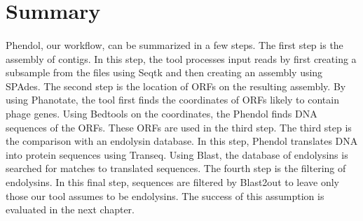 \section{Summary}
\paragraph*{}
Phendol, our workflow, can be summarized in a few steps. The first step is the assembly of contigs. In this step, the tool processes input reads by first creating a subsample from the files using Seqtk and then creating an assembly using SPAdes. The second step is the location of ORFs on the resulting assembly. By using Phanotate, the tool first finds the coordinates of ORFs likely to contain phage genes. Using Bedtools on the coordinates, the Phendol finds DNA sequences of the ORFs. These ORFs are used in the third step. The third step is the comparison with an endolysin database. In this step, Phendol translates DNA into protein sequences using Transeq. Using Blast, the database of endolysins is searched for matches to translated sequences. The fourth step is the filtering of endolysins. In this final step, sequences are filtered by Blast2out to leave only those our tool assumes to be endolysins. The success of this assumption is evaluated in the next chapter.